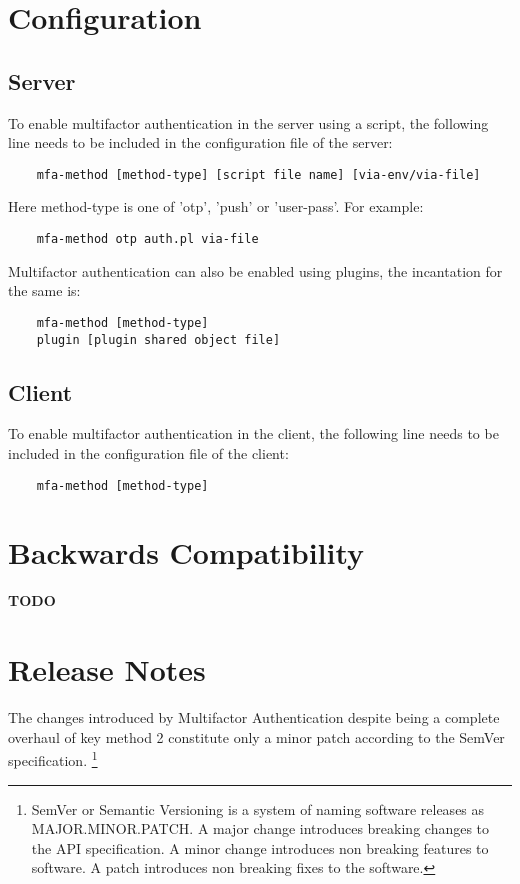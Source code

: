 \documentclass[11pt,oneside]{book}
\begin{document}
\section{Configuration}
\subsection{Server}
To enable multifactor authentication in the server using a script, the following line needs to be
included in the configuration file of the server:

\begin{verbatim}
    mfa-method [method-type] [script file name] [via-env/via-file]
\end{verbatim}

\noindent Here method-type is one of 'otp', 'push' or 'user-pass'. For example:
\begin{verbatim}
    mfa-method otp auth.pl via-file
\end{verbatim}

\noindent Multifactor authentication can also be enabled using plugins, the incantation for the same is:
\begin{verbatim}
    mfa-method [method-type]
    plugin [plugin shared object file]
\end{verbatim}

\subsection{Client}
To enable multifactor authentication in the client, the following line needs to be included in the
configuration file of the client:

\begin{verbatim}
    mfa-method [method-type]
\end{verbatim}

\section{Backwards Compatibility}
\textbf{TODO}

\section{Release Notes}
The changes introduced by Multifactor Authentication despite being a complete overhaul of key method
2 constitute only a minor patch according to the SemVer specification. \footnote{SemVer or Semantic
Versioning is a system of naming software releases as MAJOR.MINOR.PATCH. A major change introduces
breaking changes to the API specification. A minor change introduces non breaking features to software.
A patch introduces non breaking fixes to the software.}
\end{document}
